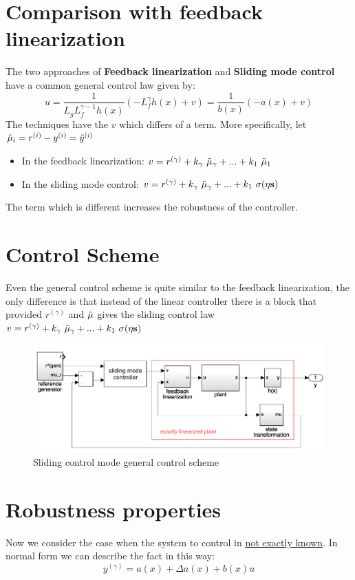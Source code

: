 \section{Comparison with feedback linearization}
The two approaches of \textbf{Feedback linearization} and \textbf{Sliding mode control} have a common general control law given by: 
$$u=\frac{1}{L_gL_f^{\gamma-1}h(x)}(-L_f^{\gamma}h(x)+v)=\frac{1}{b(x)}(-a(x)+v)$$
The techniques have the $v$ which differs of a term. More specifically, let $\Tilde{\mu}_i=r^{(i)}-y^{(i)}=\tilde{y}^{(i)}$
\begin{itemize}
    \item In the feedback linearization: $v=r^{(\gamma)}+k_\gamma \ \Tilde{\mu}_\gamma+...+k_1 \ \Tilde{\mu}_1$
    \item In the sliding mode control: $v=r^{(\gamma)}+k_\gamma \ \Tilde{\mu}_\gamma+...+k_1 \ \sigma(\eta\textbf{s})$
\end{itemize}
The term which is different increases the robustness of the controller.

\section{Control Scheme}
Even the general control scheme is quite similar to the feedback linearization, the only difference is that instead of the linear controller there is a block that provided $r^{(\gamma)}$ and $\Tilde{\mu}$ gives the sliding control law $v=r^{(\gamma)}+k_\gamma \ \Tilde{\mu}_\gamma+...+k_1 \ \sigma(\eta\textbf{s})$

\begin{figure}[h]
    \centering
    \includegraphics[scale=0.6]{NonLinearControl/images/SMC_ControlScheme.png}
    \caption{Sliding control mode general control scheme}
    \label{fig:enter-label}
\end{figure}



\section{Robustness properties}
Now we consider the case when the system to control in \underline{not exactly known}. In normal form we can describe the fact in this way: 
{\color{red}$$y^{(\gamma)}=a(x)+\Delta a(x) +b(x)u$$}

